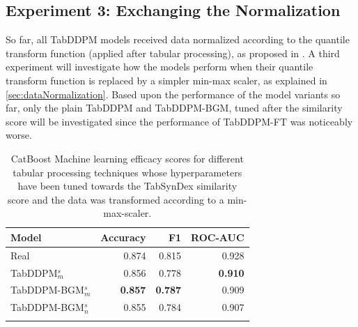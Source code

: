 \subsection{Experiment 3: Exchanging the Normalization}
\label{ch:Experiment-3}

So far, all TabDDPM models received data normalized according to the quantile transform function (applied after tabular processing), as proposed in \cite{kotelnikov2022TabDDPMModellingTabular}.
A third experiment will investigate how the models perform when their quantile transform function is replaced by a simpler min-max scaler, as explained in \autoref{sec:dataNormalization}.
Based upon the performance of the model variants so far, only the plain TabDDPM and TabDDPM-BGM, tuned after the similarity score will be investigated since the performance of
TabDDPM-FT was noticeably worse.


\begin{table}[h]
	\centering
	\begin{tabular}{lrrr}
		\toprule
		\textbf{Model}        & \textbf{Accuracy} & \textbf{F1}    & \textbf{ROC-AUC} \\
		\midrule
		Real                  & 0.874              & 0.815          & 0.928            \\
		TabDDPM$^{s}_{m}$     & 0.856              & 0.778          & \textbf{0.910}   \\
		TabDDPM-BGM$^{s}_{m}$ & \textbf{0.857}     & \textbf{0.787} & 0.909            \\
		TabDDPM-BGM$^{s}_{n}$ & 0.855              & 0.784          & 0.907            \\
		\bottomrule
		\multicolumn{4}{c}{}\\[-0.6em]
	\end{tabular}
	\caption[Experiment 3 ML-Efficacy]{CatBoost Machine learning efficacy scores for different tabular processing techniques whose hyperparameters have been tuned towards the TabSynDex similarity score
		and the data was transformed according to a min-max-scaler.}
	\label{tab:exp3-ml}
\end{table}

